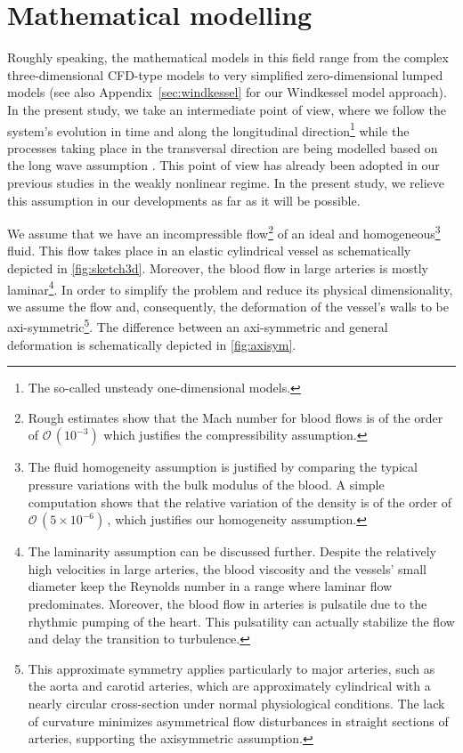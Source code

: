 \documentclass[alpha-refs, 12pt]{wiley-article}
\renewcommand{\O}{\mathcal{O}}
\begin{document}
\section{Mathematical modelling}
\label{sec:model}

Roughly speaking, the mathematical models in this field range from the complex three-dimensional CFD-type models \cite{Roe2005} to very simplified zero-dimensional lumped models \cite{Milisic2004, Alastruey2008} (see also Appendix~\ref{sec:windkessel} for our Windkessel model approach). In the present study, we take an intermediate point of view, where we follow the system's evolution in time and along the longitudinal direction\footnote{The so-called unsteady one-dimensional models.} \cite{Sherwin2003, Alastruey2011} while the processes taking place in the transversal direction are being modelled based on the long wave assumption \cite{Lavrentiev1947, Serre1956, BCL, Khakimzyanov2019}. This point of view has already been adopted in our previous studies \cite{Mitsotakis2018, Mitsotakis2019} in the weakly nonlinear regime. In the present study, we relieve this assumption in our developments as far as it will be possible.

We assume that we have an incompressible flow\footnote{Rough estimates show that the Mach number for blood flows is of the order of $\O\,(10^{-3})$ which justifies the compressibility assumption.} of an ideal and homogeneous\footnote{The fluid homogeneity assumption is justified by comparing the typical pressure variations with the bulk modulus of the blood. A simple computation shows that the relative variation of the density is of the order of $\O\,(5\times 10^{-6})\,$, which justifies our homogeneity assumption.} fluid. This flow takes place in an elastic cylindrical vessel as schematically depicted in \cref{fig:sketch3d}. Moreover, the blood flow in large arteries is mostly laminar\footnote{The laminarity assumption can be discussed further. Despite the relatively high velocities in large arteries, the blood viscosity and the vessels' small diameter keep the Reynolds number in a range where laminar flow predominates. Moreover, the blood flow in arteries is pulsatile due to the rhythmic pumping of the heart. This pulsatility can actually stabilize the flow and delay the transition to turbulence.}. In order to simplify the problem and reduce its physical dimensionality, we assume the flow and, consequently, the deformation of the vessel's walls to be axi-symmetric\footnote{This approximate symmetry applies particularly to major arteries, such as the aorta and carotid arteries, which are approximately cylindrical with a nearly circular cross-section under normal physiological conditions. The lack of curvature minimizes asymmetrical flow disturbances in straight sections of arteries, supporting the axisymmetric assumption.}. The difference between an axi-symmetric and general deformation is schematically depicted in \cref{fig:axisym}. 
\end{document}
